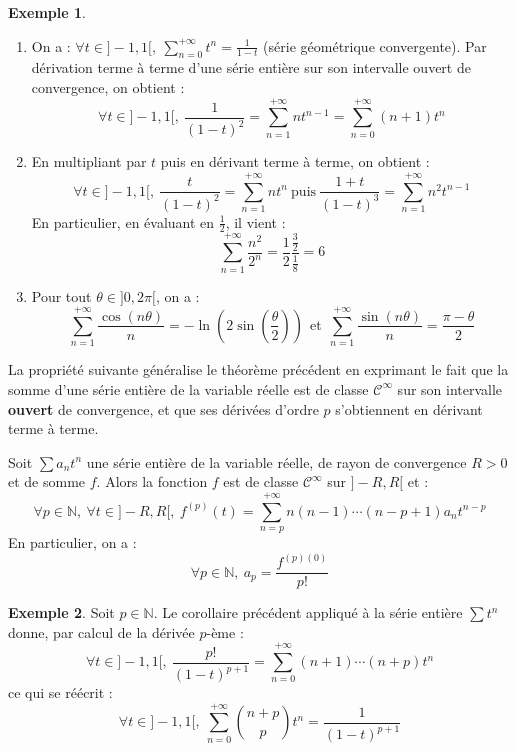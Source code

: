 \documentclass[french]{article}
\newcommand{\N}{\mathbb{N}}
\theoremstyle{plain}
\theoremstyle{definition}
\newtheorem*{ex}{Exemple}
\theoremstyle{remark}
\begin{document}
\begin{ex}
	\begin{enumerate}
		\item On a : $\forall t\in]-1,1[,\ \displaystyle\sum_{n=0}^{+\infty}t^n=\frac{1}{1-t}$ (série géométrique convergente). Par dérivation terme à terme d'une série entière sur son intervalle ouvert de convergence, on obtient : $$\forall t\in]-1,1[,\ \frac{1}{(1-t)^2}=\sum_{n=1}^{+\infty}nt^{n-1}=\sum_{n=0}^{+\infty}(n+1)t^n$$
		\item En multipliant par $t$ puis en dérivant terme à terme, on obtient : $$\forall t\in]-1,1[,\ \frac{t}{(1-t)^2}=\sum_{n=1}^{+\infty}nt^n\ \text{puis}\ \frac{1+t}{(1-t)^3}=\sum_{n=1}^{+\infty}n^2t^{n-1}$$
		En particulier, en évaluant en $\frac{1}{2}$, il vient : $$\sum_{n=1}^{+\infty}\frac{n^2}{2^n}=\frac{1}{2}\frac{\frac{3}{2}}{\frac{1}{8}}=6$$
		\item Pour tout $\theta\in]0,2\pi[$, on a : $$\sum_{n=1}^{+\infty}\frac{\cos(n\theta)}{n}=-\ln\left(2\sin\left(\frac{\theta}{2}\right)\right)\ \ \text{et}\ \ \sum_{n=1}^{+\infty}\frac{\sin(n\theta)}{n}=\frac{\pi-\theta}{2}$$
	\end{enumerate}
\end{ex}

La propriété suivante généralise le théorème précédent en exprimant le fait que la somme d'une série entière de la variable réelle est de classe $\mathcal{C}^\infty$ sur son intervalle \textbf{ouvert} de convergence, et que ses dérivées d'ordre $p$ s'obtiennent en dérivant terme à terme.

\begin{cor}%
	Soit $\displaystyle\sum a_nt^n$ une série entière de la variable réelle, de rayon de convergence $R>0$ et de somme $f$. Alors la fonction $f$ est de classe $\mathcal{C}^\infty$ sur $]-R,R[$ et : $$\forall p\in\N,\ \forall t\in]-R,R[,\ f^{(p)}(t)=\sum_{n=p}^{+\infty}n(n-1)\cdots(n-p+1)a_nt^{n-p}$$ En particulier, on a : $$\forall p\in\N,\ a_p=\frac{f^{(p)(0)}}{p!}$$
\end{cor}

\begin{ex}%
	Soit $p\in\N$. Le corollaire précédent appliqué à la série entière $\displaystyle\sum t^n$ donne, par calcul de la dérivée $p$-ème : $$\forall t\in]-1,1[,\ \frac{p!}{(1-t)^{p+1}}=\sum_{n=0}^{+\infty}(n+1)\cdots(n+p)t^n$$ ce qui se réécrit : $$\forall t\in]-1,1[,\ \sum_{n=0}^{+\infty}\binom{n+p}{p}t^n=\frac{1}{(1-t)^{p+1}}$$
\end{ex}
\end{document}
